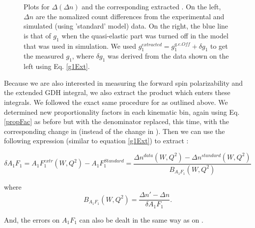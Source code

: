 \begin{figure}[h]
{\label{g1q7}
}
\label{dDnCSng1q7} %
\caption[Optional caption for list of figures]{Plots for $\Delta (\Delta n)$ and the corresponding extracted \gone. On the left, $\Delta n$ are the nomalized count differences from the experimental and simulated (using 'standard' model) data. On the right, the blue line is that of $g_1$ when the quasi-elastic part was turned off in the model that was used in simulation. We used $g_1^{extracted} = g_1^{q.e. Off} + \delta g_1$ to get the measured $g_1$, where $\delta g_1$ was derived from the data shown on the left using Eq. \ref{g1Ext}.}
\end{figure}





Because we are also interested in measuring the forward spin polarizability and the extended GDH integral, we also extract the product \afones which enters these integrals. We followed the exact same procedure for \gones as outlined above. %
We determined new proportionality factors in each kinematic bin, again using Eq. \ref{propFac} as before but with the denominator replaced, this time, with the corresponding change in \afones (instead of the change in \gone). Then we can use the following expression (similar to equation \ref{g1Ext}) to extract \afonewq:

\begin{equation}
\label{a1f1Ext}
\delta A_{1}F_{1} = A_{1}F_{1}^{extr}(W,Q^2) - A_{1}F_{1}^{Standard} = \frac{\Delta n^{data}(W,Q^2) - \Delta n^{standard}(W,Q^2)}{B_{A_1F_1}(W,Q^2) }
\end{equation}

where
\begin{equation}
\label{propFac}
B_{A_1F_1}(W,Q^2)  = \frac{\Delta n' - \Delta n}{\delta A_1F_1}.
\end{equation}

And, the errors on $A_1F_1$ can also be dealt in the same way as on \gone.






